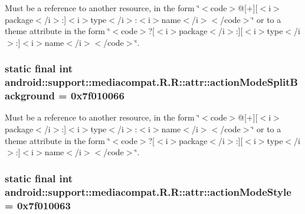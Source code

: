 Must be a reference to another resource, in the form \char`\"{}$<$code$>$@\mbox{[}+\mbox{]}\mbox{[}$<$i$>$package$<$/i$>$:\mbox{]}$<$i$>$type$<$/i$>$:$<$i$>$name$<$/i$>$$<$/code$>$\char`\"{} or to a theme attribute in the form \char`\"{}$<$code$>$?\mbox{[}$<$i$>$package$<$/i$>$:\mbox{]}\mbox{[}$<$i$>$type$<$/i$>$:\mbox{]}$<$i$>$name$<$/i$>$$<$/code$>$\char`\"{}. \hypertarget{classandroid_1_1support_1_1mediacompat_1_1_r_1_1attr_96044e93a5fa3290b9d787a3da750bc4}{
\subsubsection[{actionModeSplitBackground}]{\setlength{\rightskip}{0pt plus 5cm}static final int android::support::mediacompat.R.R::attr::actionModeSplitBackground = 0x7f010066}}
\label{classandroid_1_1support_1_1mediacompat_1_1_r_1_1attr_96044e93a5fa3290b9d787a3da750bc4}


Must be a reference to another resource, in the form \char`\"{}$<$code$>$@\mbox{[}+\mbox{]}\mbox{[}$<$i$>$package$<$/i$>$:\mbox{]}$<$i$>$type$<$/i$>$:$<$i$>$name$<$/i$>$$<$/code$>$\char`\"{} or to a theme attribute in the form \char`\"{}$<$code$>$?\mbox{[}$<$i$>$package$<$/i$>$:\mbox{]}\mbox{[}$<$i$>$type$<$/i$>$:\mbox{]}$<$i$>$name$<$/i$>$$<$/code$>$\char`\"{}. \hypertarget{classandroid_1_1support_1_1mediacompat_1_1_r_1_1attr_89486e12b76779a8febcc1913040d5d7}{
\subsubsection[{actionModeStyle}]{\setlength{\rightskip}{0pt plus 5cm}static final int android::support::mediacompat.R.R::attr::actionModeStyle = 0x7f010063}}
\label{classandroid_1_1support_1_1mediacompat_1_1_r_1_1attr_89486e12b76779a8febcc1913040d5d7}



